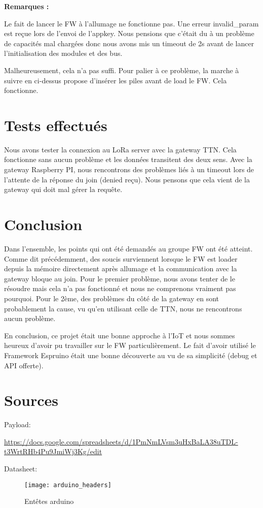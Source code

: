\textbf{Remarques :}

Le fait de lancer le FW à l'allumage ne fonctionne pas. Une erreur invalid\_param est reçue lors de l'envoi de l'appkey. Nous pensions que c'était du à un problème de capacités mal chargées donc nous avons mis un timeout de 2s avant de lancer l'initialisation des modules et des bus.

Malheureusement, cela n'a pas suffi. Pour palier à ce problème, la marche à suivre en ci-dessus propose d'insérer les piles avant de load le FW. Cela fonctionne.

\section{Tests effectués}

Nous avons tester la connexion au LoRa server avec la gateway TTN. Cela fonctionne sans aucun problème et les données transitent des deux sens.
Avec la gateway Raspberry PI, nous rencontrons des problèmes liés à un timeout lors de l'attente de la réponse du join (denied reçu). Nous pensons que cela vient de la gateway qui doit mal gérer la requête.
\clearpage

\section{Conclusion}

Dans l'ensemble, les points qui ont été demandés au groupe FW ont été atteint. Comme dit précédemment, des soucis surviennent lorsque le FW est loader depuis la mémoire directement après allumage et la communication avec la gateway bloque au join. Pour le premier problème, nous avons tenter de le résoudre mais cela n'a pas fonctionné et nous ne comprenons vraiment pas pourquoi.
Pour le 2ème, des problèmes du côté de la gateway en sont probablement la cause, vu qu'en utilisant celle de TTN, nous ne rencontrons aucun problème.

En conclusion, ce projet était une bonne approche à l'IoT et nous sommes heureux d'avoir pu travailler sur le FW particulièrement. Le fait d'avoir utilisé le Framework Espruino était une bonne découverte au vu de sa simplicité (debug et API offerte).

\section{Sources}

Payload: 

\url{https://docs.google.com/spreadsheets/d/1PmNmLVsm3uHxBaLA38uTDL-t3WrtRHb4Pu9JmiWj3Kg/edit}
\vspace{3mm}

Datasheet: 

\begin{figure}[h!]
\centering
\texttt{[image: arduino\_headers]}
\caption{Entêtes arduino}
\end{figure}
\clearpage